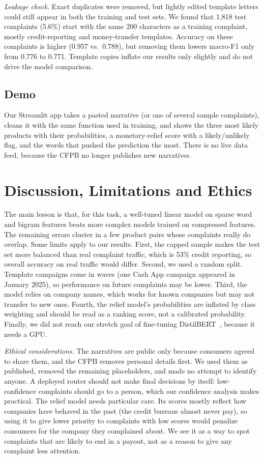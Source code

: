\documentclass[conference]{IEEEtran}
\begin{document}
\textit{Leakage check.} Exact duplicates were removed, but lightly edited template letters could still appear in both the training and test sets. We found that 1,818 test complaints (5.6\%) start with the same 200 characters as a training complaint, mostly credit-reporting and money-transfer templates. Accuracy on these complaints is higher (0.957 vs.\ 0.788), but removing them lowers macro-F1 only from 0.776 to 0.771. Template copies inflate our results only slightly and do not drive the model comparison.

\subsection{Demo}
Our Streamlit app takes a pasted narrative (or one of several sample complaints), cleans it with the same function used in training, and shows the three most likely products with their probabilities, a monetary-relief score with a likely/unlikely flag, and the words that pushed the prediction the most. There is no live data feed, because the CFPB no longer publishes new narratives.

\section{Discussion, Limitations and Ethics}
The main lesson is that, for this task, a well-tuned linear model on sparse word and bigram features beats more complex models trained on compressed features. The remaining errors cluster in a few product pairs whose complaints really do overlap. Some limits apply to our results. First, the capped sample makes the test set more balanced than real complaint traffic, which is 53\% credit reporting, so overall accuracy on real traffic would differ. Second, we used a random split. Template campaigns come in waves (one Cash App campaign appeared in January 2025), so performance on future complaints may be lower. Third, the model relies on company names, which works for known companies but may not transfer to new ones. Fourth, the relief model's probabilities are inflated by class weighting and should be read as a ranking score, not a calibrated probability. Finally, we did not reach our stretch goal of fine-tuning DistilBERT~\cite{distilbert}, because it needs a GPU.

\textit{Ethical considerations.} The narratives are public only because consumers agreed to share them, and the CFPB removes personal details first. We used them as published, removed the remaining placeholders, and made no attempt to identify anyone. A deployed router should not make final decisions by itself: low-confidence complaints should go to a person, which our confidence analysis makes practical. The relief model needs particular care. Its scores mostly reflect how companies have behaved in the past (the credit bureaus almost never pay), so using it to give lower priority to complaints with low scores would penalize consumers for the company they complained about. We see it as a way to spot complaints that are likely to end in a payout, not as a reason to give any complaint less attention.
\end{document}

